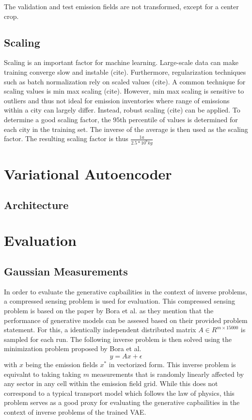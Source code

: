 The validation and test emission fields are not transformed, except for a center crop.

\subsection{Scaling}
Scaling is an important factor for machine learning.
Large-scale data can make training converge slow and instable (cite).
Furthermore, regularization techniques such as batch normalization rely on scaled values (cite).
A common technique for scaling values is min max scaling (cite).
However, min max scaling is sensitive to outliers and thus not ideal for emission inventories where range of emissions within a city can largely differ.
Instead, robust scaling (cite) can be applied.
To determine a good scaling factor, the $95$th percentile of values is determined for each city in the training set.
The inverse of the average is then used as the scaling factor.
The resulting scaling factor is thus $\frac{1 a}{2.5 * 10^6 kg}$

\section{Variational Autoencoder}

\subsection{Architecture}

\section{Evaluation}

\subsection{Gaussian Measurements}
In order to evaluate the generative capbailities in the context of inverse problems, a compressed sensing problem is used for evaluation.
This compressed sensing problem is based on the paper by Bora et al. as they mention that the performance of generative models can be assesed based on their provided problem statement.
For this, a identically independent distributed matrix $A \in R^{m \times 15000}$ is sampled for each run.
The following inverse problem is then solved using the minimization problem proposed by Bora et al.
\begin{equation}
    y = A x + \epsilon
\end{equation}
with $x$ being the emission fields $x^*$ in vectorized form.
This inverse problem is equivalnt to taking taking $m$ measurements that is randomly linearly affected by any sector in any cell within the emission field grid.
While this does not correspond to a typical transport model which follows the law of physics, this problem serves as a good proxy for evaluating the generative capbailities in the context of inverse problems of the trained VAE. 

